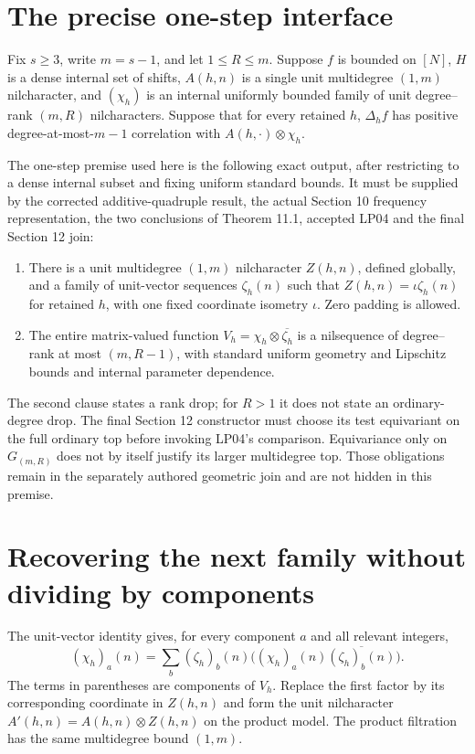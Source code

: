 \documentclass[11pt]{article}
\begin{document}
\section{The precise one-step interface}

Fix $s\geq3$, write $m=s-1$, and let $1\leq R\leq m$.
Suppose $f$ is bounded on $[N]$, $H$ is a dense internal set of
shifts, $A(h,n)$ is a single unit multidegree $(1,m)$ nilcharacter,
and $(\chi_h)$ is an internal uniformly bounded family of unit
degree--rank $(m,R)$ nilcharacters. Suppose that for every retained
$h$, $\Delta_h f$ has positive degree-at-most-$m-1$ correlation with
$A(h,\cdot)\otimes\chi_h$.

The one-step premise used here is the following exact output, after
restricting to a dense internal subset and fixing uniform standard
bounds. It must be supplied by the corrected additive-quadruple result,
the actual Section 10 frequency representation, the two conclusions of
Theorem 11.1, accepted LP04 and the final Section 12 join:
\begin{enumerate}
\item There is a unit multidegree $(1,m)$ nilcharacter $Z(h,n)$,
defined globally, and a family of unit-vector sequences $\zeta_h(n)$
such that $Z(h,n)=\iota\zeta_h(n)$ for retained $h$, with one fixed
coordinate isometry $\iota$. Zero padding is allowed.
\item The entire matrix-valued function
$V_h=\chi_h\otimes\overline{\zeta_h}$ is a nilsequence of
degree--rank at most $(m,R-1)$, with standard uniform geometry and
Lipschitz bounds and internal parameter dependence.
\end{enumerate}
The second clause states a rank drop; for $R>1$ it does not state
an ordinary-degree drop. The final Section 12 constructor must choose
its test equivariant on the full ordinary top before invoking LP04's
comparison. Equivariance only on $G_{(m,R)}$ does not by itself
justify its larger multidegree top. Those obligations remain in the
separately authored geometric join and are not hidden in this premise.

\section{Recovering the next family without dividing by components}

The unit-vector identity gives, for every component $a$ and all relevant
integers,
\begin{equation}\label{eq:recovery}
 (\chi_h)_a(n)=\sum_b (\zeta_h)_b(n)
       \bigl((\chi_h)_a(n)\overline{(\zeta_h)_b(n)}\bigr).
\end{equation}
The terms in parentheses are components of $V_h$. Replace the first
factor by its corresponding coordinate in $Z(h,n)$ and form the unit
nilcharacter $A'(h,n)=A(h,n)\otimes Z(h,n)$ on the product model.
The product filtration has the same multidegree bound $(1,m)$.
\end{document}
